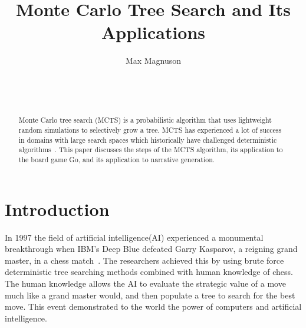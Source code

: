 \documentclass{sig-alternate}
\begin{document}

\title{Monte Carlo Tree Search and Its Applications}


\author{
\alignauthor
Max Magnuson\\
	\\
	\\
	\\
}

\maketitle
\begin{abstract}
Monte Carlo tree search (MCTS) is a probabilistic algorithm that uses lightweight random simulations to selectively grow a tree. MCTS has experienced a lot of success in domains with large search spaces which historically have challenged deterministic algorithms~\cite{RAVEinGo}. This paper discusses the steps of the MCTS algorithm, its application to the board game Go, and its application to narrative generation. 
\end{abstract}


\section{Introduction} 
In 1997 the field of artificial intelligence(AI) experienced a monumental breakthrough when IBM's Deep Blue defeated Garry Kasparov, a reigning grand master, in a chess match~\cite{TheGrandChallenge}. The researchers achieved this by using brute force deterministic tree searching methods combined with human knowledge of chess. The human knowledge allows the AI to evaluate the strategic value of a move much like a grand master would, and then populate a tree to search for the best move. This event demonstrated to the world the power of computers and artificial intelligence. 
\end{document}

